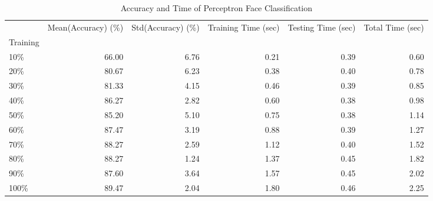 \documentclass[10pt,parskip=half,
toc=sectionentrywithdots,
bibliography=totocnumbered,
captions=tableheading,numbers=noendperiod]{scrartcl}
\begin{document}
\begin{table}[H]
\caption{Accuracy and Time of Perceptron Face Classification}\label{tbl:tlabel}
\centering
\begin{adjustbox}{max width=\textwidth}
\begin{tabular}{lrrrrr}
\toprule
{} &  Mean(Accuracy) (\%) &  Std(Accuracy) (\%) &  Training Time (sec) &  Testing Time (sec) &  Total Time (sec) \\
Training &                     &                    &                      &                     &                   \\
\midrule
10\%      &               66.00 &               6.76 &                 0.21 &                0.39 &              0.60 \\
20\%      &               80.67 &               6.23 &                 0.38 &                0.40 &              0.78 \\
30\%      &               81.33 &               4.15 &                 0.46 &                0.39 &              0.85 \\
40\%      &               86.27 &               2.82 &                 0.60 &                0.38 &              0.98 \\
50\%      &               85.20 &               5.10 &                 0.75 &                0.38 &              1.14 \\
60\%      &               87.47 &               3.19 &                 0.88 &                0.39 &              1.27 \\
70\%      &               88.27 &               2.59 &                 1.12 &                0.40 &              1.52 \\
80\%      &               88.27 &               1.24 &                 1.37 &                0.45 &              1.82 \\
90\%      &               87.60 &               3.64 &                 1.57 &                0.45 &              2.02 \\
100\%     &               89.47 &               2.04 &                 1.80 &                0.46 &              2.25 \\
\bottomrule
\end{tabular}

\end{adjustbox}
\end{table}

\begin{figure}[H]\begin{center}\end{center}\label{fig:flabel}\end{figure}
\end{document}
